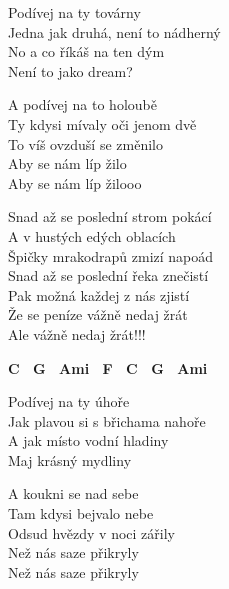 
\ve{}
Podívej na ty továrny\\
Jedna jak druhá, není to nádherný\\
No a co říkáš na ten dým\\
Není to jako dream?

A podívej na to holoubě\\
Ty kdysi mívaly oči jenom dvě\\
To víš ovzduší se změnilo\\
Aby se nám líp žilo\\
Aby se nám líp žilooo

\cho{}
Snad až se poslední strom pokácí\\
A v hustých edých oblacích\\
Špičky mrakodrapů zmizí napoád\\
Snad až se poslední řeka znečistí\\
Pak možná každej z nás zjistí\\
Že se peníze vážně nedaj žrát\\
Ale vážně nedaj žrát!!!

\re{}
\textbf{{\footnotesize C \ G \ Ami \ F \ C \ G \ Ami}}

\ve{}
Podívej na ty úhoře \\
Jak plavou si s břichama nahoře\\
A jak místo vodní hladiny \\
Maj krásný mydliny

A koukni se nad sebe\\
Tam kdysi bejvalo nebe\\
Odsud hvězdy v noci zářily\\
Než nás saze přikryly\\
Než nás saze přikryly



\esong{}